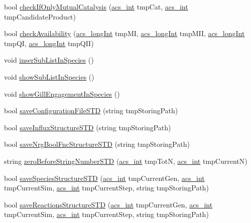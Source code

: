 \begin{DoxyCompactItemize}
\item 
bool \hyperlink{a00014_abdafaeba15b5d32fd35569869c6244d5}{check\-If\-Only\-Mutual\-Catalysis} (\hyperlink{a00072_a8d277355641a098190360234e2ebde35}{acs\-\_\-int} tmp\-Cat, \hyperlink{a00072_a8d277355641a098190360234e2ebde35}{acs\-\_\-int} tmp\-Candidate\-Product)
\item 
bool \hyperlink{a00014_ad3ebcd7ab1c9ba1a0f65b264b97adf33}{check\-Availability} (\hyperlink{a00072_a19319d75f02db4308bc5c0026d98cd85}{acs\-\_\-long\-Int} tmp\-M\-I, \hyperlink{a00072_a19319d75f02db4308bc5c0026d98cd85}{acs\-\_\-long\-Int} tmp\-M\-I\-I, \hyperlink{a00072_a19319d75f02db4308bc5c0026d98cd85}{acs\-\_\-long\-Int} tmp\-Q\-I, \hyperlink{a00072_a19319d75f02db4308bc5c0026d98cd85}{acs\-\_\-long\-Int} tmp\-Q\-I\-I)
\item 
void \hyperlink{a00014_af293fafca4582120d88f888d70d8623a}{inser\-Sub\-List\-In\-Species} ()
\item 
void \hyperlink{a00014_a5cb194f927ddc7a804a942ca71f062af}{show\-Sub\-List\-In\-Species} ()
\item 
void \hyperlink{a00014_aef1d3687767151218f3b7379dc230430}{show\-Gill\-Engagement\-In\-Species} ()
\item 
bool \hyperlink{a00014_a71f4c5ff1c11a9d61cbc818682a4a91e}{save\-Configuration\-File\-S\-T\-D} (string tmp\-Storing\-Path)
\item 
bool \hyperlink{a00014_a8f831e2db11fa5d840484345dac64fc7}{save\-Influx\-Structure\-S\-T\-D} (string tmp\-Storing\-Path)
\item 
bool \hyperlink{a00014_a1412b9b1c3bd3e42bcb481f5e18ea931}{save\-Nrg\-Bool\-Fnc\-Structure\-S\-T\-D} (string tmp\-Storing\-Path)
\item 
string \hyperlink{a00014_a8699a0f85f5e8dc23eb8f78fa22c6b17}{zero\-Before\-String\-Number\-S\-T\-D} (\hyperlink{a00072_a8d277355641a098190360234e2ebde35}{acs\-\_\-int} tmp\-Tot\-N, \hyperlink{a00072_a8d277355641a098190360234e2ebde35}{acs\-\_\-int} tmp\-Current\-N)
\item 
bool \hyperlink{a00014_a9daeb4f255100b8ad59de9ea80b19b5b}{save\-Species\-Structure\-S\-T\-D} (\hyperlink{a00072_a8d277355641a098190360234e2ebde35}{acs\-\_\-int} tmp\-Current\-Gen, \hyperlink{a00072_a8d277355641a098190360234e2ebde35}{acs\-\_\-int} tmp\-Current\-Sim, \hyperlink{a00072_a8d277355641a098190360234e2ebde35}{acs\-\_\-int} tmp\-Current\-Step, string tmp\-Storing\-Path)
\item 
bool \hyperlink{a00014_ad381c4ce24045d504539bb7c74800739}{save\-Reactions\-Structure\-S\-T\-D} (\hyperlink{a00072_a8d277355641a098190360234e2ebde35}{acs\-\_\-int} tmp\-Current\-Gen, \hyperlink{a00072_a8d277355641a098190360234e2ebde35}{acs\-\_\-int} tmp\-Current\-Sim, \hyperlink{a00072_a8d277355641a098190360234e2ebde35}{acs\-\_\-int} tmp\-Current\-Step, string tmp\-Storing\-Path)

\end{DoxyCompactItemize}
